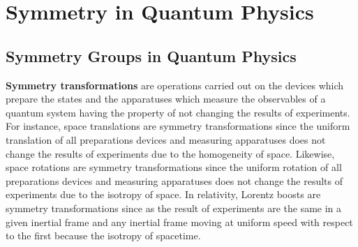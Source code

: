 \chapter{Symmetry in Quantum Physics}

\section{Symmetry Groups in Quantum Physics}

\textbf{Symmetry transformations} are operations carried out on the devices which prepare the states and the apparatuses which measure the observables of a quantum system having the property of not changing the results of experiments. For instance, space translations are symmetry transformations since the uniform translation of all preparations devices and measuring apparatuses does not change the results of experiments due to the homogeneity of space. Likewise, space rotations are symmetry transformations since the uniform rotation of all preparations devices and measuring apparatuses does not change the results of experiments due to the isotropy of space. In relativity, Lorentz boosts are symmetry transformations since as the result of experiments are the same in a given inertial frame and any inertial frame moving at uniform speed with respect to the first because the isotropy of spacetime.

